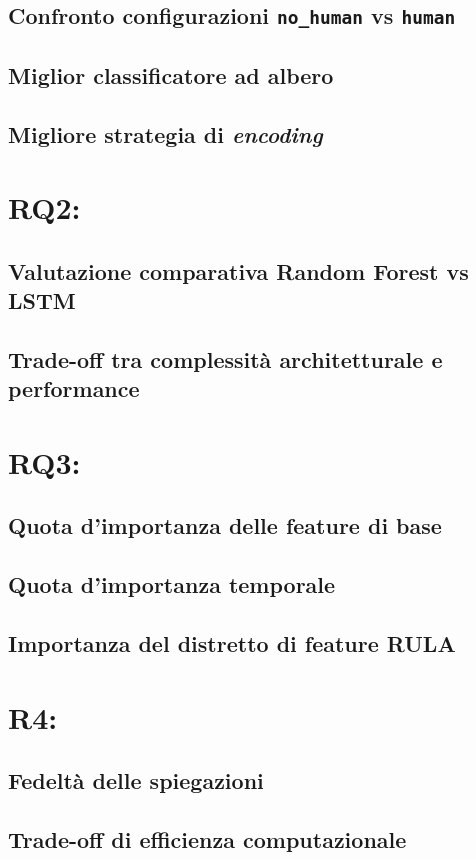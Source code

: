 \subsection{Confronto configurazioni \texttt{no\_human} vs \texttt{human}}
\label{subsec:rq1_human_vs_nohuman}

\subsection{Miglior classificatore ad albero}
\label{subsec:rq1_top_classifier}

\subsection{Migliore strategia di \textit{encoding}}
\label{subsec:rq1_top_classifier}

\section{RQ2:}
\label{sec:rq2_rf_vs_lstm}

\subsection{Valutazione comparativa Random Forest vs LSTM}
\label{subsec:rq2_rf_vs_lstm_encoding}

\subsection{Trade-off tra complessità architetturale e performance}
\label{subsec:rq2_tradeoffs}


\section{RQ3:}
\label{sec:rq3_shap_explainability}

\subsection{Quota d'importanza delle feature di base}
\label{subsec:rq3_base_feature}

\subsection{Quota d'importanza temporale}
\label{subsec:rq3_step_dynamics}

\subsection{Importanza del distretto di feature RULA}
\label{subsec:rq3_rula_wrist}

\section{R4:}
\label{sec:rq4_methodological_comparison}

\subsection{Fedeltà delle spiegazioni}
\label{subsec:rq4_fidelity_convergence}

\subsection{Trade-off di efficienza computazionale}
\label{subsec:rq4_computational_efficiency}